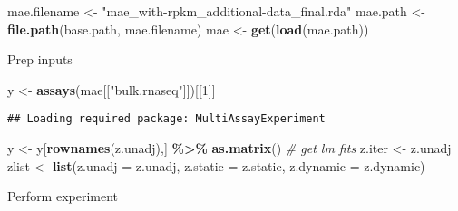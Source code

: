 \documentclass[
]{article}
\newenvironment{Shaded}{\begin{snugshade}}{\end{snugshade}}
\newcommand{\AttributeTok}[1]{\textcolor[rgb]{0.13,0.29,0.53}{#1}}
\newcommand{\CommentTok}[1]{\textcolor[rgb]{0.56,0.35,0.01}{\textit{#1}}}
\newcommand{\DecValTok}[1]{\textcolor[rgb]{0.00,0.00,0.81}{#1}}
\newcommand{\FunctionTok}[1]{\textcolor[rgb]{0.13,0.29,0.53}{\textbf{#1}}}
\newcommand{\NormalTok}[1]{#1}
\newcommand{\OtherTok}[1]{\textcolor[rgb]{0.56,0.35,0.01}{#1}}
\newcommand{\SpecialCharTok}[1]{\textcolor[rgb]{0.81,0.36,0.00}{\textbf{#1}}}
\newcommand{\StringTok}[1]{\textcolor[rgb]{0.31,0.60,0.02}{#1}}
\begin{document}
\begin{Shaded}
\begin{Highlighting}[]
\NormalTok{mae.filename }\OtherTok{\textless{}{-}} \StringTok{"mae\_with{-}rpkm\_additional{-}data\_final.rda"}
\NormalTok{mae.path }\OtherTok{\textless{}{-}} \FunctionTok{file.path}\NormalTok{(base.path, mae.filename)}
\NormalTok{mae }\OtherTok{\textless{}{-}} \FunctionTok{get}\NormalTok{(}\FunctionTok{load}\NormalTok{(mae.path))}
\end{Highlighting}
\end{Shaded}

Prep inputs

\begin{Shaded}
\begin{Highlighting}[]
\NormalTok{y }\OtherTok{\textless{}{-}} \FunctionTok{assays}\NormalTok{(mae[[}\StringTok{"bulk.rnaseq"}\NormalTok{]])[[}\DecValTok{1}\NormalTok{]]}
\end{Highlighting}
\end{Shaded}

\begin{verbatim}
## Loading required package: MultiAssayExperiment
\end{verbatim}

\begin{Shaded}
\begin{Highlighting}[]
\NormalTok{y }\OtherTok{\textless{}{-}}\NormalTok{ y[}\FunctionTok{rownames}\NormalTok{(z.unadj),] }\SpecialCharTok{\%\textgreater{}\%} \FunctionTok{as.matrix}\NormalTok{()}
\CommentTok{\# get lm fits}
\NormalTok{z.iter }\OtherTok{\textless{}{-}}\NormalTok{ z.unadj}
\NormalTok{zlist }\OtherTok{\textless{}{-}} \FunctionTok{list}\NormalTok{(}\AttributeTok{z.unadj =}\NormalTok{ z.unadj, }\AttributeTok{z.static =}\NormalTok{ z.static, }\AttributeTok{z.dynamic =}\NormalTok{ z.dynamic)}
\end{Highlighting}
\end{Shaded}

Perform experiment
\end{document}
